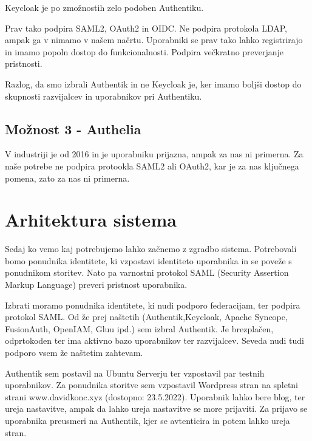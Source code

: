 \documentclass[a4paper,12pt,openright]{book}
\begin{document}
Keycloak je po zmožnostih zelo podoben Authentiku. 

Prav tako podpira SAML2, OAuth2 in OIDC. Ne podpira protokola LDAP, ampak ga v nimamo v našem načrtu. 
\newline
Uporabniki se prav tako lahko registrirajo in imamo popoln dostop do funkcionalnosti. Podpira večkratno preverjanje pristnosti.

Razlog, da smo izbrali Authentik in ne Keycloak je, ker imamo boljši dostop do skupnosti razvijalcev in uporabnikov pri Authentiku.

\subsection{Možnost 3 - Authelia}

V industriji je od 2016 in je uporabniku prijazna, ampak za nas ni primerna. 
\newline
Za naše potrebe ne podpira protookla SAML2 ali OAuth2, kar je za nas ključnega pomena, zato za nas ni primerna. 

\section{Arhitektura sistema}

Sedaj ko vemo kaj potrebujemo lahko začnemo z zgradbo sistema. Potrebovali bomo ponudnika identitete, ki vzpostavi identiteto uporabnika in se poveže s ponudnikom storitev. Nato pa varnostni protokol SAML (Security Assertion Markup Language) preveri pristnost uporabnika. 

Izbrati moramo ponudnika identitete, ki nudi podporo federacijam, ter podpira protokol SAML. Od že prej naštetih (Authentik,Keycloak, Apache Syncope, FusionAuth, OpenIAM, Gluu ipd.) sem izbral Authentik. Je brezplačen, odprtokoden ter ima aktivno bazo uporabnikov ter razvijalcev. Seveda nudi tudi podporo vsem že naštetim zahtevam.  
\newline

Authentik sem postavil na Ubuntu Serverju ter vzpostavil par testnih uporabnikov. Za ponudnika storitve sem vzpostavil Wordpress stran na spletni strani www.davidkonc.xyz (dostopno: 23.5.2022). Uporabnik lahko bere blog, ter ureja nastavitve, ampak da lahko ureja nastavitve se more prijaviti. Za prijavo se uporabnika preusmeri na Authentik, kjer se avtenticira in potem lahko ureja stran. 
\end{document}
